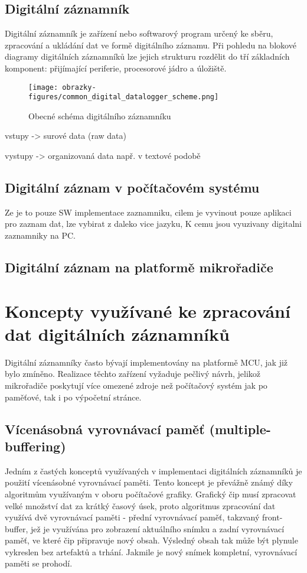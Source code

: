 \subsection{Digitální záznamník}
Digitální záznamník je zařízení nebo softwarový program určený ke sběru, zpracování a ukládání dat ve formě digitálního záznamu. Při pohledu na blokové diagramy digitálních záznamníků 
lze jejich strukturu rozdělit do tří základních komponent: přijímající periferie, procesorové jádro a úložiště.


\begin{figure}[h] %
    \centering
    \texttt{[image: obrazky-figures/common\_digital\_datalogger\_scheme.png]}
    \caption{Obecné schéma digitálního záznamníku}
    \label{fig:polygraaf}
\end{figure}
vstupy -> surové data (raw data)

vystupy -> organizovaná data např. v textové podobě

\subsection{Digitální záznam v počítačovém systému}
Ze je to pouze SW implementace zaznamniku, cilem je vyvinout pouze aplikaci pro zaznam dat, lze vybirat z daleko vice jazyku, K cemu jsou vyuzivany digitalni zaznamniky na PC.

\subsection{Digitální záznam na platformě mikrořadiče}

\section{Koncepty využívané ke zpracování dat digitálních záznamníků}
Digitální záznamníky často bývají implementovány na platformě MCU, jak již bylo zmíněno. Realizace těchto zařízení vyžaduje pečlivý návrh, jelikož mikrořadiče poskytují více omezené zdroje 
než počítačový systém jak po paměťové, tak i po výpočetní stránce. 

\subsection{Vícenásobná vyrovnávací paměť (multiple-buffering)}
Jedním z častých konceptů využívaných v implementaci digitálních záznamníků je použití vícenásobné vyrovnávací paměti. Tento koncept je převážně známý díky algoritmům využívaným v 
oboru počítačové grafiky. Grafický čip musí zpracovat velké množství dat za krátký časový úsek, proto algoritmus zpracování dat využívá dvě vyrovnávací paměti - přední vyrovnávací paměť, 
takzvaný front-buffer, jež je využívána pro zobrazení aktuálního snímku a zadní vyrovnávací paměť, ve které čip připravuje nový obsah. Výsledný obsah tak může být plynule vykreslen 
bez artefaktů a trhání. Jakmile je nový snímek kompletní, vyrovnávací paměti se prohodí. \cite{double_buffering_model}

